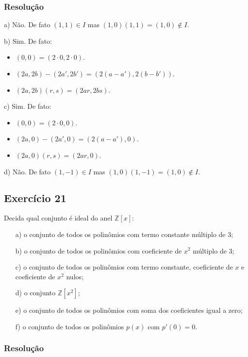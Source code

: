 \documentclass[10pt,a4paper]{article}
\begin{document}
\subsubsection*{Resolução}

a) Não. De fato $(1,1)\in I$ mas $(1,0)(1,1)=(1,0)\notin I$.

\medskip
\noindent
b) Sim. De fato:
\begin{itemize}
\item $(0,0)=(2\cdot 0,2\cdot 0)$.
\item $(2a,2b)-(2a',2b')=(2(a-a'),2(b-b'))$.
\item $(2a,2b)(r,s)=(2ar,2bs)$.
\end{itemize}

\medskip
\noindent
c) Sim. De fato:
\begin{itemize}
\item $(0,0)=(2\cdot 0,0)$.
\item $(2a,0)-(2a',0)=(2(a-a'),0)$.
\item $(2a,0)(r,s)=(2ar,0)$.
\end{itemize}

\medskip
\noindent
d) Não. De fato $(1,-1)\in I$ mas $(1,0)(1,-1)=(1,0)\notin I$.

\subsection*{Exercício 21}
Decida qual conjunto é ideal do anel $\mathbb{Z}[x]$:
\begin{itemize}
\item[a)] o conjunto de todos os polinômios com termo constante múltiplo de $3$;
\item[b)] o conjunto de todos os polinômios com coeficiente de $x^2$ múltiplo de $3$;
\item[c)] o conjunto de todos os polinômios com termo constante, coeficiente de $x$ e coeficiente de $x^2$ nulos;
\item[d)] o conjunto $\mathbb{Z}[x^2]$;
\item[e)] o conjunto de todos os polinômios com soma dos coeficientes igual a zero;
\item[f)] o conjunto de todos os polinômios $p(x)$ com $p'(0)=0$.
\end{itemize}

\subsubsection*{Resolução}
\end{document}
